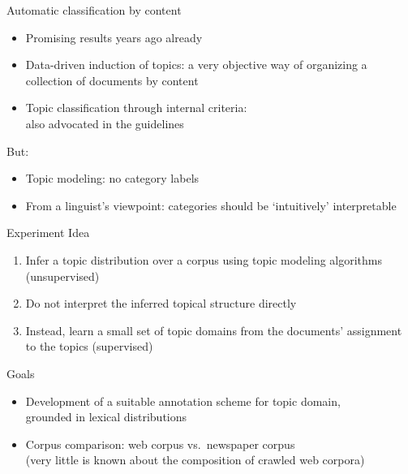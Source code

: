 \documentclass{beamer}
\begin{document}
\begin{frame}
  {Automatic classification by content}  
  \begin{itemize}
    \item Promising results years ago already \citep{Sebastiani2002}
    \item \alert{Data-driven induction of topics}: a very objective way of organizing a collection of documents by content
    \item Topic classification through internal criteria:\\ also advocated in the \citet{EAGLES1996} guidelines
   \end{itemize}
  
  \vspace{0.5cm}     
\pause
  But:
  \begin{itemize}
    \item \alert{Topic modeling}: no category labels
    \item From a linguist's viewpoint: categories should be `intuitively' interpretable
  \end{itemize}
  \end{frame}


  \begin{frame}
    {Experiment}
    Idea
    \begin{enumerate}
      \item Infer a topic distribution over a corpus using topic modeling algorithms (\alert{unsupervised})
      \item Do not interpret the inferred topical structure directly
      \item Instead, learn a small set of topic domains from the documents' assignment to the topics (\alert{supervised})
    \end{enumerate}
\pause
    Goals
    \begin{itemize}
      \item Development of a suitable annotation scheme for topic domain,\\
      grounded in lexical distributions
      \item Corpus comparison: web corpus vs.\ newspaper corpus\\
       (very little is known about the composition of crawled web corpora)
    \end{itemize}
    \end{frame}
\end{document}
